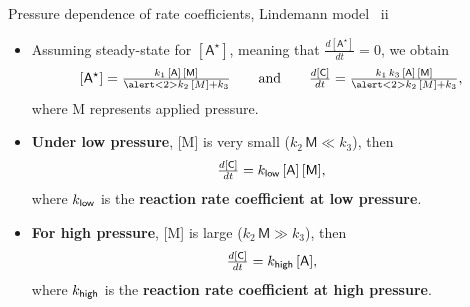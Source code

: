 \begin{frame}{Pressure dependence of rate coefficients, Lindemann model \, ii}
	\begin{itemize}
		\item Assuming steady-state for $\mathsf{[A^\star]}$, meaning that $\tfrac{d[\mathsf{A^\star}]}{dt} = 0$, we obtain
		\[
		\mathsf{[A^\star]} = \tfrac{k_1 \, \mathsf{[A]\, [M]}}{\alert<2>{k_2 \, [M]} + k_3} \qquad \mbox{and}  \qquad
		\tfrac{d\mathsf{[C]}}{dt} = \tfrac{k_1 \, k_3 \, \mathsf{[A]\, [M]}}{\alert<2>{k_2 \, [M]}  + k_3}, 
		\]
		where M represents applied pressure.\\[5pt]
		\pause
		\pause
		\item {\bf Under low pressure}, [M] is very small ($k_2\, \mathsf{M} \ll k_3$), then 
		\[	
		\tfrac{d\mathsf{[C]}}{dt} = k_{\sf low} \, \mathsf{[A]\, [M]},
		\]
		where $k_{\sf low}$ is the {\bf reaction rate coefficient at low pressure}.\\[5pt]
		\pause
		\item {\bf For high pressure}, [M] is large  ($k_2\, \mathsf{M} \gg k_3$), then 
		\[	
		\tfrac{d\mathsf{[C]}}{dt} = k_{\sf high} \, \mathsf{[A]},
		\]
		where $k_{\sf high} $ is the {\bf reaction rate coefficient at high pressure}.
	\end{itemize}
\end{frame}
%
